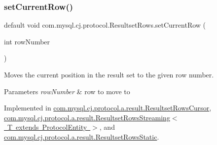 \mbox{\label{interfacecom_1_1mysql_1_1cj_1_1protocol_1_1_resultset_rows_a813efe790e18424a02b692a3f9213446}} 
\subsubsection{\texorpdfstring{set\+Current\+Row()}{setCurrentRow()}}
{\footnotesize\ttfamily default void com.\+mysql.\+cj.\+protocol.\+Resultset\+Rows.\+set\+Current\+Row (\begin{DoxyParamCaption}\item[{int}]{row\+Number }\end{DoxyParamCaption})}

Moves the current position in the result set to the given row number.


\begin{DoxyParams}{Parameters}
{\em row\+Number} & row to move to \\
\hline
\end{DoxyParams}


Implemented in \mbox{\hyperlink{classcom_1_1mysql_1_1cj_1_1protocol_1_1a_1_1result_1_1_resultset_rows_cursor_aab53d9374408ceaf15369f0b515ab56e}{com.\+mysql.\+cj.\+protocol.\+a.\+result.\+Resultset\+Rows\+Cursor}}, \mbox{\hyperlink{classcom_1_1mysql_1_1cj_1_1protocol_1_1a_1_1result_1_1_resultset_rows_streaming_ac2448082c41dad09ccd418eaf3f400e0}{com.\+mysql.\+cj.\+protocol.\+a.\+result.\+Resultset\+Rows\+Streaming$<$ T extends Protocol\+Entity $>$}}, and \mbox{\hyperlink{classcom_1_1mysql_1_1cj_1_1protocol_1_1a_1_1result_1_1_resultset_rows_static_a6975dcd56b2033fcfc7dbfe7a4fa83d8}{com.\+mysql.\+cj.\+protocol.\+a.\+result.\+Resultset\+Rows\+Static}}.

\mbox{\label{interfacecom_1_1mysql_1_1cj_1_1protocol_1_1_resultset_rows_a5121e355be1da17a4085068bb5611fb0}} 
